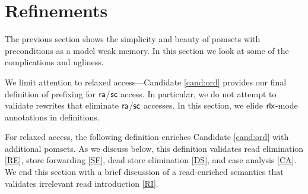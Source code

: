 \section{Refinements}
\label{sec:refine}

The previous section shows the simplicity and beauty of pomsets with
preconditions as a model weak memory.  In this section we look at some of the
complications and ugliness.

We limit attention to relaxed access---Candidate \ref{cand:ord} provides our
final definition of prefixing for ${\mathsf{ra}}$/${\mathsf{sc}}$ access.  In particular,
we do not attempt to validate rewrites that eliminate ${\mathsf{ra}}$/${\mathsf{sc}}$
accesses.  In this section, we elide ${\mathsf{rlx}}$-mode annotations in definitions.

For relaxed access, the following definition enriches Candidate
\ref{cand:ord} with additional pomsets.  As we discuss below, this definition
validates read elimination \eqref{RE}, store forwarding \eqref{SF}, dead
store elimination \eqref{DS}, and case analysis \eqref{CA}.  We end this
section with a brief discussion of a read-enriched semantics that validates
irrelevant read introduction \eqref{RI}.


